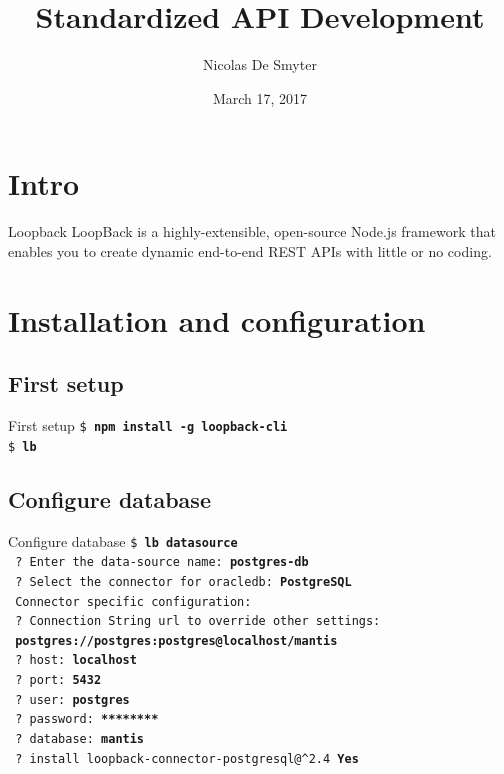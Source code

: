 \documentclass[11pt]{beamer}
\author{Nicolas De Smyter}
\title{Standardized API Development}
\institute{FDS}
\date{March 17, 2017}
\begin{document}
\begin{frame}
\titlepage
\end{frame}

\begin{frame}
\tableofcontents
\end{frame}

\section{Intro}
\begin{frame}{Loopback}
LoopBack is a highly-extensible, open-source Node.js framework that enables you to create dynamic end-to-end REST APIs with little or no coding.
\end{frame}

\section{Installation and configuration}
\subsection{First setup}
\begin{frame}{First setup}
\texttt{\$ \textbf{npm install -g loopback-cli}}\\
\texttt{\$ \textbf{lb}}
\end{frame}

\subsection{Configure database}
\begin{frame}{Configure database}
\texttt{\$ \textbf{lb datasource}}\\
\texttt{    ? Enter the data-source name: \textbf{postgres-db}}\\
\texttt{    ? Select the connector for oracledb: \textbf{PostgreSQL}}\\
\texttt{    Connector specific configuration:}\\
\texttt{    ? Connection String url to override other settings:}\\
\texttt{    	\textbf{postgres://postgres:postgres@localhost/mantis}}\\
\texttt{    ? host: \textbf{localhost}}\\
\texttt{    ? port: \textbf{5432}}\\
\texttt{    ? user: \textbf{postgres}}\\
\texttt{    ? password: \textbf{********}}\\
\texttt{    ? database: \textbf{mantis}}\\
\texttt{    ? install loopback-connector-postgresql@\^{}2.4 \textbf{Yes}}
\end{frame}
\end{document}
